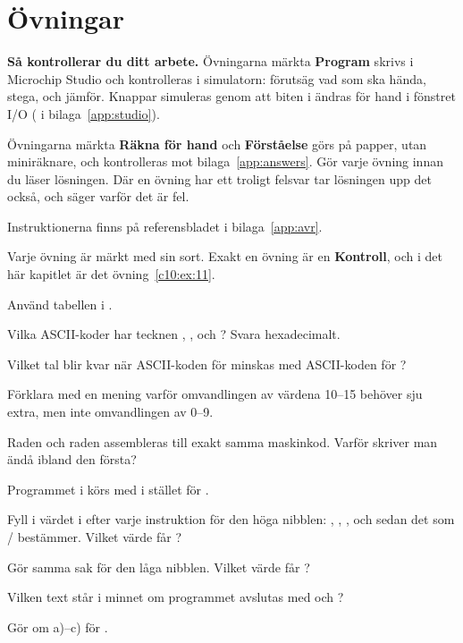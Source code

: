 
\section{Övningar}
\label{c10:sec:exercises}\label{c10:app:d}

\begin{aside}
\textbf{Så kontrollerar du ditt arbete.} Övningarna märkta \textbf{Program} skrivs i Microchip
Studio och kontrolleras i simulatorn: förutsäg vad som ska hända, stega, och jämför. Knappar
simuleras genom att biten i  ändras för hand i fönstret I/O ( i
bilaga~\ref{app:studio}).

Övningarna märkta \textbf{Räkna för hand} och \textbf{Förståelse} görs på papper, utan
miniräknare, och kontrolleras mot bilaga~\ref{app:answers}. Gör varje övning innan du läser
lösningen. Där en övning har ett troligt felsvar tar lösningen upp det också, och säger varför det
är fel.

Instruktionerna finns på referensbladet i bilaga~\ref{app:avr}.

Varje övning är märkt med sin sort. Exakt en övning är en \textbf{Kontroll}, och i det här kapitlet
är det övning~\ref{c10:ex:11}.
\end{aside}

\label{c10:ex:1}
Använd tabellen i .
\begin{parts}
  \item Vilka ASCII-koder har tecknen , ,  och ? Svara
    hexadecimalt.
  \item Vilket tal blir kvar när ASCII-koden för  minskas med ASCII-koden för
    ?
  \item Förklara med en mening varför omvandlingen av värdena 10--15 behöver sju extra, men inte
    omvandlingen av 0--9.
  \item Raden  och raden  assembleras till exakt samma
    maskinkod. Varför skriver man ändå ibland den första?
\end{parts}

\label{c10:ex:2}
Programmet i  körs med  i stället för .
\begin{parts}
  \item Fyll i värdet i  efter varje instruktion för den höga nibblen: ,
    , , och sedan det som / bestämmer. Vilket värde får
    ?
  \item Gör samma sak för den låga nibblen. Vilket värde får ?
  \item Vilken text står i minnet om programmet avslutas med  och
    ?
  \item Gör om a)--c) för .
\end{parts}

